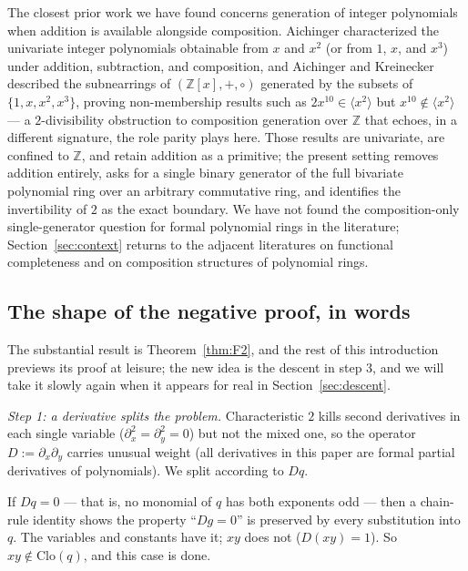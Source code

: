 \documentclass[11pt]{article}
\theoremstyle{definition}
\theoremstyle{remark}
\newcommand{\Z}{\mathbb{Z}}
\newcommand{\Clo}{\mathrm{Clo}}
\begin{document}
The closest prior work we have found concerns generation of integer
polynomials when addition is available alongside composition.
Aichinger \cite{Aichinger2013} characterized the univariate integer
polynomials obtainable from $x$ and $x^2$ (or from $1$, $x$, and
$x^3$) under addition, subtraction, and composition, and Aichinger
and Kreinecker \cite{AichingerKreinecker} described the subnearrings
of $(\Z[x], +, \circ)$ generated by the subsets of
$\{1, x, x^2, x^3\}$, proving non-membership results such as
$2x^{10} \in \langle x^2 \rangle$ but
$x^{10} \notin \langle x^2 \rangle$ --- a $2$-divisibility
obstruction to composition generation over $\Z$ that echoes, in a
different signature, the role parity plays here.  Those results are
univariate, are confined to $\Z$, and retain addition as a
primitive; the present setting removes addition entirely, asks for a
single binary generator of the full bivariate polynomial ring over
an arbitrary commutative ring, and identifies the invertibility of
$2$ as the exact boundary.  We have not found the composition-only
single-generator question for formal polynomial rings in the
literature; Section~\ref{sec:context} returns to the adjacent
literatures on functional completeness and on composition structures
of polynomial rings.

\subsection{The shape of the negative proof, in words}\label{sec:shape}

The substantial result is Theorem~\ref{thm:F2}, and the rest of this
introduction previews its proof at leisure; the new idea is the
descent in step 3, and we will take it slowly again when it appears
for real in Section~\ref{sec:descent}.

\medskip
\noindent\emph{Step 1: a derivative splits the problem.}
Characteristic $2$ kills second derivatives in each single variable
($\partial_x^2 = \partial_y^2 = 0$) but not the mixed one, so the
operator $D := \partial_x \partial_y$ carries unusual weight (all
derivatives in this paper are formal partial derivatives of
polynomials).  We split according to $Dq$.

If $Dq = 0$ --- that is, no monomial of $q$ has both exponents odd ---
then a chain-rule identity shows the property ``$Dg = 0$'' is
preserved by every substitution into $q$.  The variables and constants
have it; $xy$ does not ($D(xy) = 1$).  So $xy \notin \Clo(q)$, and
this case is done.
\end{document}
